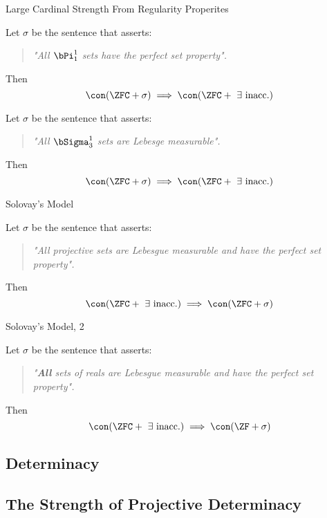 \documentclass{beamer}
\begin{document}
\begin{frame}{Large Cardinal Strength From Regularity Properites}
\begin{theorem}[Solovay, 1969]
Let $\sigma$ be the sentence that asserts:
\begin{quotation}
\emph{"All $\bPi^1_1$ sets have the perfect set property". }
\end{quotation}

Then
$$  \con(\ZFC + \sigma) \implies \con(\ZFC + \text{ } \exists \text{ inacc.})$$
\end{theorem}

\begin{theorem}[Shelah, 1984]
Let $\sigma$ be the sentence that asserts:
\begin{quotation}
\emph{"All $\bSigma^1_3$ sets are Lebesge measurable". }
\end{quotation}

Then
$$  \con(\ZFC + \sigma) \implies \con(\ZFC + \text{ } \exists \text{ inacc.})$$
\end{theorem}

\end{frame}


\begin{frame}{Solovay's Model}
\begin{theorem}[Solovay, 1970]

Let $\sigma$ be the sentence that asserts:
\begin{quotation}
\emph{"All projective sets are Lebesgue
measurable and have the perfect set property". }
\end{quotation}


Then
$$\con(\ZFC + \text{ } \exists \text{ inacc.}) \implies \con(\ZFC + \sigma)$$
\end{theorem}
\end{frame}

\begin{frame}{Solovay's Model, 2}
\begin{theorem}[Solovay, 1970]

Let $\sigma$ be the sentence that asserts:
\begin{quotation}
\emph{"\textbf{All} sets of reals are Lebesgue
measurable and have the perfect set property". }
\end{quotation}


Then
$$\con(\ZFC + \text{ } \exists \text{ inacc.}) \implies \con(\ZF + \sigma)$$
\end{theorem}
\end{frame}


\subsection{Determinacy}

\subsection{The Strength of Projective Determinacy}
\end{document}
